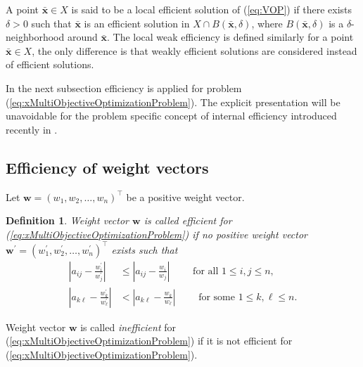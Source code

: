 \documentclass{article}
\theoremstyle{plain}
\newtheorem{definition}{Definition}[section]
\begin{document}
A point $\mathbf{\bar x}\in X$ is said to be a  local ef{\kern0pt}f{\kern0pt}icient
solution of (\ref{eq:VOP}) if there exists $\delta >0$ such that
$\mathbf{\bar x}$ is an ef{\kern0pt}f{\kern0pt}icient  solution in $X\cap
B(\mathbf{\bar x},\delta)$, where $B(\mathbf{\bar x},\delta)$ is a
$\delta$-neighborhood around $\mathbf{\bar x}$. The local weak
ef{\kern0pt}f{\kern0pt}iciency is def{\kern0pt}ined similarly for a point $\mathbf{\bar x}\in
X$, the only dif{\kern0pt}ference is that weakly ef{\kern0pt}f{\kern0pt}icient solutions are
considered instead of ef{\kern0pt}f{\kern0pt}icient solutions.


In the next subsection ef{\kern0pt}f{\kern0pt}iciency is applied
for problem  (\ref{eq:xMultiObjectiveOptimizationProblem}). The
explicit presentation will be unavoidable for the problem specif{\kern0pt}ic
concept of internal ef{\kern0pt}f{\kern0pt}iciency introduced recently in
\cite{Bozoki2014}.

\subsection{Ef{\kern0pt}f{\kern0pt}iciency of weight vectors}

Let
$\mathbf{w} = (w_1, w_2, \ldots, w_n)^{\top}$ be a positive weight vector.


\begin{definition} \label{def:DefinitionEfficient}  %
Weight vector $\mathbf{w}$ is called \emph{ef{\kern0pt}f{\kern0pt}icient} for  (\ref{eq:xMultiObjectiveOptimizationProblem})
if no positive weight vector
$\mathbf{w^{\prime}} = (w^{\prime}_1, w^{\prime}_2, \ldots, w^{\prime}_n)^{\top}$
exists such that
\begin{align}
 \left|a_{ij} - \frac{w^{\prime}_i}{w^{\prime}_j} \right| &\leq \left|a_{ij} - \frac{w_i}{w_j} \right| \qquad \text{ for all } 1 \leq i,j \leq n, \label{def:DefinitionEfficientProperty1}  \\   %
 \left|a_{k{\ell}} - \frac{w^{\prime}_k}{w^{\prime}_{\ell}} \right| &<  \left|a_{k{\ell}} - \frac{w_k}{w_{\ell}} \right|  \qquad \text{ for some } 1 \leq k,\ell \leq n.  \label{def:DefinitionEfficientProperty2}    %
\end{align}
\end{definition}
Weight vector $\mathbf{w}$ is called \emph{inef{\kern0pt}f{\kern0pt}icient} for  (\ref{eq:xMultiObjectiveOptimizationProblem}) if it is not ef{\kern0pt}f{\kern0pt}icient for  (\ref{eq:xMultiObjectiveOptimizationProblem}). \\
\end{document}
